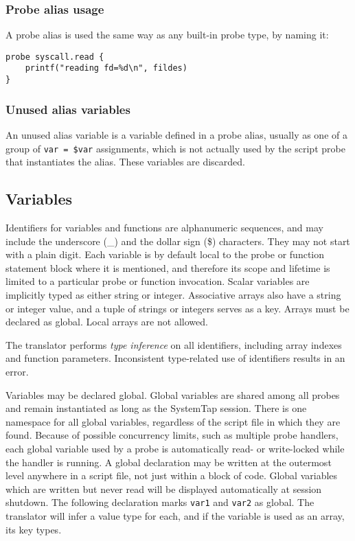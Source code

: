 \documentclass[twoside,english]{article}
\newenvironment{vindent}
{\begin{list}{}{\setlength{\listparindent}{6pt}}
\item[]}
{\end{list}}
\begin{document}
\subsubsection{Probe alias usage}

A probe alias is used the same way as any built-in probe type, by
naming it:

\begin{vindent}
\begin{verbatim}
probe syscall.read {
    printf("reading fd=%d\n", fildes)
}
\end{verbatim}
\end{vindent}

\subsubsection{Unused alias variables}
An unused alias variable is a variable defined in a probe alias, usually
as one of a group of \texttt{var = \$var} assignments, which is not actually
used by the script probe that instantiates the alias. These variables are
discarded.

\subsection{Variables\label{sub:Variables}}
Identifiers for variables and functions are alphanumeric sequences, and may
include the underscore (\_) and the dollar sign (\$) characters. They may
not start with a plain digit. Each variable is by default local to the probe
or function statement block where it is mentioned, and therefore its scope
and lifetime is limited to a particular probe or function invocation. Scalar
variables are implicitly typed as either string or integer. Associative arrays
also have a string or integer value, and a tuple of strings or integers serves
as a key. Arrays must be declared as global. Local arrays
are not allowed.

The translator performs \emph{type inference} on all identifiers, including
array indexes and function parameters. Inconsistent type-related use of identifiers
results in an error.

Variables may be declared global. Global variables are shared among all probes
and remain instantiated as long as the SystemTap session. There is one namespace
for all global variables, regardless of the script file in which they are
found. Because of possible concurrency limits, such as multiple probe handlers,
each global variable used by a probe is automatically read- or write-locked
while the handler is running. A global declaration may be written at the
outermost level anywhere in a script file, not just within a block of code.
Global variables which are written but never read will be displayed
automatically at session shutdown.  The following declaration marks 
\texttt{var1} and \texttt{var2} as global.
The translator will infer a value type for each, and if the variable is used
as an array, its key types.
\end{document}
